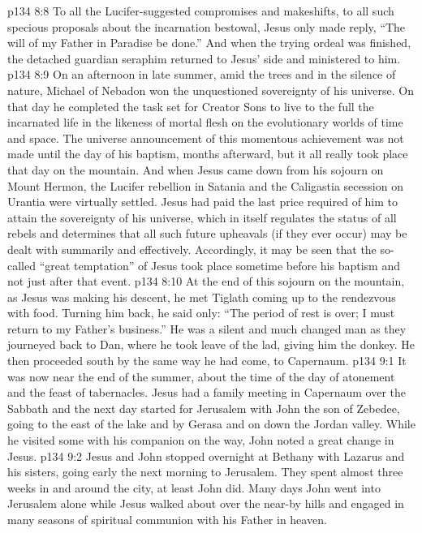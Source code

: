 \vs p134 8:8 To all the Lucifer\hyp{}suggested compromises and makeshifts, to all such specious proposals about the incarnation bestowal, Jesus only made reply, \textcolor{ubdarkred}{“The will of my Father in Paradise be done.”} And when the trying ordeal was finished, the detached guardian seraphim returned to Jesus’ side and ministered to him.
\pc \vs p134 8:9 On an afternoon in late summer, amid the trees and in the silence of nature, Michael of Nebadon won the unquestioned sovereignty of his universe. On that day he completed the task set for Creator Sons to live to the full the incarnated life in the likeness of mortal flesh on the evolutionary worlds of time and space. The universe announcement of this momentous achievement was not made until the day of his baptism, months afterward, but it all really took place that day on the mountain. And when Jesus came down from his sojourn on Mount Hermon, the Lucifer rebellion in Satania and the Caligastia secession on Urantia were virtually settled. Jesus had paid the last price required of him to attain the sovereignty of his universe, which in itself regulates the status of all rebels and determines that all such future upheavals (if they ever occur) may be dealt with summarily and effectively. Accordingly, it may be seen that the so\hyp{}called “great temptation” of Jesus took place sometime before his baptism and not just after that event.
\vs p134 8:10 At the end of this sojourn on the mountain, as Jesus was making his descent, he met Tiglath coming up to the rendezvous with food. Turning him back, he said only: \textcolor{ubdarkred}{“The period of rest is over; I must return to my Father’s business.”} He was a silent and much changed man as they journeyed back to Dan, where he took leave of the lad, giving him the donkey. He then proceeded south by the same way he had come, to Capernaum.
\vs p134 9:1 It was now near the end of the summer, about the time of the day of atonement and the feast of tabernacles. Jesus had a family meeting in Capernaum over the Sabbath and the next day started for Jerusalem with John the son of Zebedee, going to the east of the lake and by Gerasa and on down the Jordan valley. While he visited some with his companion on the way, John noted a great change in Jesus.
\vs p134 9:2 Jesus and John stopped overnight at Bethany with Lazarus and his sisters, going early the next morning to Jerusalem. They spent almost three weeks in and around the city, at least John did. Many days John went into Jerusalem alone while Jesus walked about over the near\hyp{}by hills and engaged in many seasons of spiritual communion with his Father in heaven.

